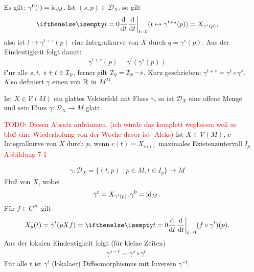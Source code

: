 \begin{bem}
  Es gilt: $\gamma^0(\cdot) = \operatorname{id}_M$. Ist $(s,p) \in \mathcal D_{X}$, so gilt
  \[ \difffrac[t=0]{}{t}(t \mapsto \gamma^{t+s}(p)) = X_{\gamma^s(p)}, \]
  also ist $t \mapsto \gamma^{t+s}(p)$ eine Integralkurve von $X$ durch $q = \gamma^s(p)$. Aus der Eindeutigkeit folgt damit:
  \begin{align*}
    \gamma^{t+s}(p) = \gamma^t(\gamma^s(p))
  \end{align*}
  f"ur alle $s, t$, $s+t \in \operatorname{\mathcal{I}}_p$, ferner gilt $\operatorname{\mathcal{I}}_q = \operatorname{\mathcal{I}}_p - s$. Kurz geschrieben: $\gamma^{t+s} = \gamma^t \circ \gamma^s$. Also definiert $\gamma$ einen  von $\operatorname{\mathbb{R}}$ in $M^M$.
\end{bem}

\begin{Satz}
  Ist $X \in \mathcal V(M)$ ein glattes Vektorfeld mit Fluss $\gamma$, so ist $\mathcal D_X$ eine offene Menge und sein Fluss $\gamma \colon \mathcal D_X \to M$ glatt.
\end{Satz}



\begin{bem}[Erinnerung]
\textcolor{red}{TODO: Diesen Absatz aufräumen. (ich würde das komplett weglassen weil es bloß eine Wiederholung von der Woche davor ist -Aleks)}
Ist $X \in \mathcal V(M)$, $c$ Integralkurve von $X$ durch $p$, wenn $c(t) = X_{c(t)}$ maximales Existenzintervall $I_p$\\

\textcolor{red}{Abbildung 7-1}

\begin{align*}
	\gamma \colon \mathcal D_X = \{(t,p) \mid p \in M, t \in I_p\} \to M
\end{align*}
Fluß von $X$, wobei
\begin{align*}
	\dot \gamma^t = X_{\gamma^t(p)}, \gamma^0 = \operatorname{id}_M.
\end{align*}
Für $f \in C^{\infty}$ gilt
\begin{align*}
	X_p(t) = \dot \gamma^t(pXf) = \difffrac[t=0]{}{t}(f \circ \gamma^t)(p).
\end{align*}
Aus der lokalen Eindeutigkeit folgt (für kleine Zeiten)
\begin{align*}
	\gamma^{s-t} = \gamma^s \circ \gamma^t.
\end{align*}
Für alle $t$ ist $\gamma^t$ (lokalaer) Diffeomorphismus mit Inversen $\gamma^{-t}$.
\end{bem}


